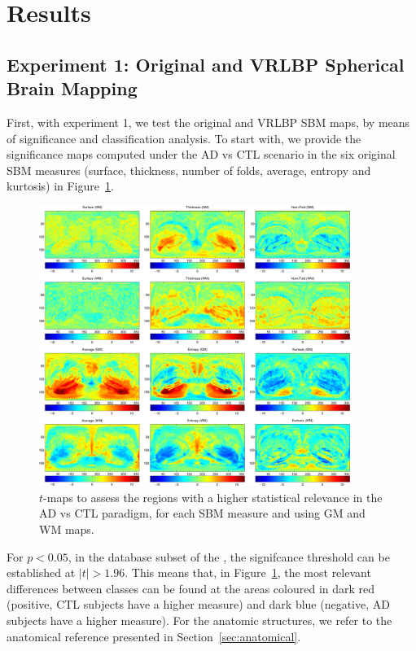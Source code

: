 \section{Results}

\subsection{Experiment 1: Original and \acs{VRLBP} Spherical Brain Mapping}
First, with experiment 1, we test the original and \ac{VRLBP} \ac{SBM} maps, by means of significance and classification analysis. To start with, we provide the significance maps computed under the \ac{AD} vs \ac{CTL} scenario in the six original \ac{SBM} measures (surface, thickness, number of folds, average, entropy and kurtosis) in  Figure~\ref{fig:tmaps}. 

\begin{figure}[htp]
	\centering
	\includegraphics[width=0.9\textwidth]{Graphics/ch6/07-tmaps}
	\caption[\acs{SBM} t-maps under the \acs{AD} vs \acs{CTL} for \acs{GM} and \acs{WM} images.]{$t$-maps to assess the regions with a higher statistical relevance in the \acs{AD} vs \acs{CTL} paradigm, for each \ac{SBM} measure and using \ac{GM} and \ac{WM} maps. }
	\label{fig:tmaps}
\end{figure}

For $p<0.05$, in the database subset of the \adnimri{}, the signifcance threshold can be established at $|t|>1.96$. This means that, in Figure~\ref{fig:tmaps}, the most relevant differences between classes can be found at the areas coloured in dark red (positive, \ac{CTL} subjects have a higher measure) and dark blue (negative, \ac{AD} subjects have a higher measure). For the anatomic structures, we refer to the anatomical reference presented in Section~\ref{sec:anatomical}. 

